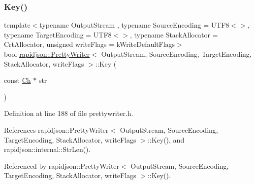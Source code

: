 \subsubsection{\texorpdfstring{Key()}{Key()}\hspace{0.1cm}{\footnotesize\ttfamily [2/2]}}
{\footnotesize\ttfamily template$<$typename Output\+Stream , typename Source\+Encoding  = U\+T\+F8$<$$>$, typename Target\+Encoding  = U\+T\+F8$<$$>$, typename Stack\+Allocator  = Crt\+Allocator, unsigned write\+Flags = k\+Write\+Default\+Flags$>$ \\
bool \mbox{\hyperlink{classrapidjson_1_1_pretty_writer}{rapidjson\+::\+Pretty\+Writer}}$<$ Output\+Stream, Source\+Encoding, Target\+Encoding, Stack\+Allocator, write\+Flags $>$\+::Key (\begin{DoxyParamCaption}\item[{const \mbox{\hyperlink{classrapidjson_1_1_pretty_writer_a74a38902073aa599c8bcc6a3ca6126d0}{Ch}} $\ast$}]{str }\end{DoxyParamCaption})}



Definition at line 188 of file prettywriter.\+h.


\begin{DoxyCode}{0}

\end{DoxyCode}


References rapidjson\+::\+Pretty\+Writer$<$ Output\+Stream, Source\+Encoding, Target\+Encoding, Stack\+Allocator, write\+Flags $>$\+::\+Key(), and rapidjson\+::internal\+::\+Str\+Len().



Referenced by rapidjson\+::\+Pretty\+Writer$<$ Output\+Stream, Source\+Encoding, Target\+Encoding, Stack\+Allocator, write\+Flags $>$\+::\+Key().

\mbox{\label{classrapidjson_1_1_pretty_writer_afb049092845d2c0168f1570cf4ad66bc}} 

